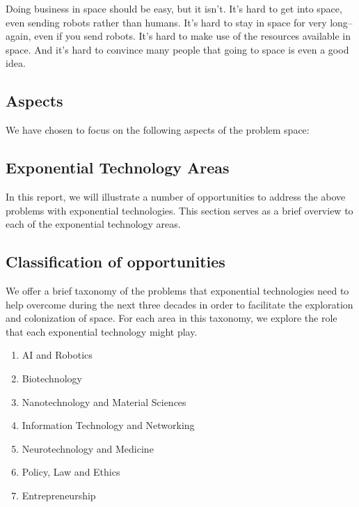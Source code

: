 \documentclass[letter,11pt]{article}
\begin{document}
Doing business in space should be easy, but it isn't. It's hard to get into
space, even sending robots rather than humans. It's hard to stay in space for
very long--again, even if you send robots.  It's hard to make use of the
resources available in space. And it's hard to convince many people that going
to space is even a good idea.

\subsection{Aspects}

We have chosen to focus on the following aspects of the problem space:



\subsection{Exponential Technology Areas}

In this report, we will illustrate a number of opportunities to address the
above problems with exponential technologies. This section serves as a brief
overview to each of the exponential technology areas.



\subsection{Classification of opportunities}

We offer a brief taxonomy of the problems that exponential technologies need to
help overcome during the next three decades in order to facilitate the
exploration and colonization of space. For each area in this taxonomy, we
explore the role that each exponential technology might play.

\begin{enumerate}
	\item AI and Robotics \item   Biotechnology \item  Nanotechnology and Material Sciences \item  Information Technology and Networking \item  Neurotechnology and Medicine \item  Policy, Law and Ethics \item Entrepreneurship 
\end{enumerate}
\end{document}
